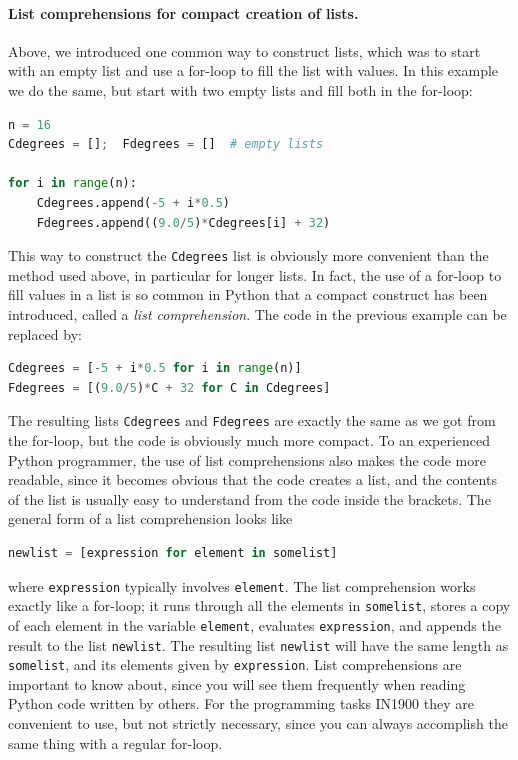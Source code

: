 \documentclass[graybox,envcountchap,sectrefs,final]{svmonodo}
\begin{document}
\paragraph{List comprehensions for compact creation of lists.}
Above, we introduced one common way to construct lists, which was to start with an empty list and use a for-loop to fill the list with
values. In this example we do the same, but start with two empty lists and fill both in the for-loop:
\begin{lstlisting}[language=Python,style=blue1]
n = 16
Cdegrees = [];  Fdegrees = []  # empty lists

for i in range(n):
    Cdegrees.append(-5 + i*0.5)
    Fdegrees.append((9.0/5)*Cdegrees[i] + 32)
\end{lstlisting}
This way to construct the \texttt{Cdegrees} list is obviously more convenient than the method used above, in particular
for longer lists. In fact, the use of a for-loop to fill values in a list is so common in Python that a compact
construct has been introduced, called a \emph{list comprehension}. The code in the previous example can be replaced by:
\begin{lstlisting}[language=Python,style=blue1]
Cdegrees = [-5 + i*0.5 for i in range(n)]
Fdegrees = [(9.0/5)*C + 32 for C in Cdegrees]
\end{lstlisting}
The resulting lists \texttt{Cdegrees} and \texttt{Fdegrees} are exactly the same as we got from the for-loop, but the code is obviously much more
compact. To an experienced Python programmer, the use of list comprehensions also makes the code more readable, since it becomes obvious that
the code creates a list, and the contents of the list is usually easy to understand from the code inside the brackets.
The general form of a list comprehension looks like
\begin{lstlisting}[language=Python,style=blue1]
newlist = [expression for element in somelist]
\end{lstlisting}
where \texttt{expression} typically involves \texttt{element}. The list comprehension works exactly like a for-loop; it runs through all the elements
in \texttt{somelist}, stores a copy of each element in the variable \texttt{element}, evaluates \texttt{expression}, and appends the result to
the list \texttt{newlist}. The resulting list \texttt{newlist} will have the same length as \texttt{somelist}, and its elements given by \texttt{expression}.
List comprehensions are important to know about, since you will see them frequently when reading Python code written by others.
For the programming tasks IN1900 they are convenient to use, but not strictly necessary, since you can always accomplish the
same thing with a regular for-loop.
\end{document}
